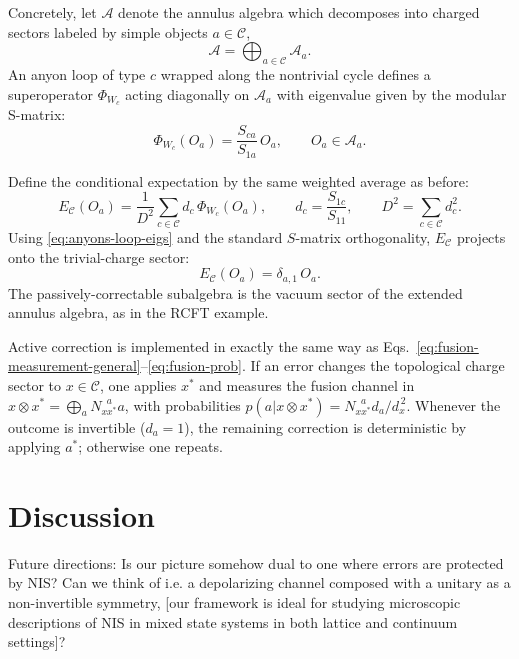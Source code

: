 \documentclass{article}
\newcommand{\mA}{\mathcal{A}}
\theoremstyle{definition}
\begin{document}
  Concretely, let $\mA$ denote the annulus algebra which decomposes into charged
  sectors labeled by simple objects $a\in\mathcal{C}$,
  \begin{equation}
    \mA=\bigoplus_{a\in\mathcal{C}}\mA_{a}.
  \end{equation}
  An anyon loop of type $c$ wrapped along the nontrivial cycle defines a
  superoperator $\Phi_{W_c}$ acting diagonally on $\mA_{a}$ with eigenvalue
  given by the modular S-matrix:
  \begin{equation}
    \label{eq:anyons-loop-eigs}\Phi_{W_c}(O_{a})=\frac{S_{ca}}{S_{1a}}\,O_{a},\qquad
    O_{a}\in\mA_{a}.
  \end{equation}

  Define the conditional expectation by the same weighted average as before:
  \begin{equation}
    \label{eq:anyons-condexp}E_{\mathcal{C}}(O_{a})=\frac{1}{D^{2}}\sum_{c\in\mathcal{C}}
    d_{c}\,\Phi_{W_c}(O_{a}),\qquad d_{c}=\frac{S_{1c}}{S_{11}},\qquad D^{2}= \sum
    _{c\in\mathcal{C}}d_{c}^{2}.
  \end{equation}
  Using \eqref{eq:anyons-loop-eigs} and the standard $S$-matrix orthogonality, $E
  _{\mathcal{C}}$ projects onto the trivial-charge sector:
  \begin{equation}
    E_{\mathcal{C}}(O_{a})=\delta_{a,1}\,O_{a}.
  \end{equation}
  The passively-correctable subalgebra is the vacuum sector of the extended
  annulus algebra, as in the RCFT example.

  Active correction is implemented in exactly the same way as Eqs.~\eqref{eq:fusion-measurement-general}--\eqref{eq:fusion-prob}.
  If an error changes the topological charge sector to $x\in\mathcal{C}$, one applies
  $x^{*}$ and measures the fusion channel in $x\otimes x^{*}=\bigoplus_{a}N_{xx^*}
  ^{\;\;a}a$, with probabilities
  $p(a|x\otimes x^{*})=N_{xx^*}^{\;\;a}d_{a}/d_{x}^{\,2}$. Whenever the outcome is
  invertible ($d_{a}=1$), the remaining correction is deterministic by applying
  $a^{*}$; otherwise one repeats.

  \section{Discussion}

  \color{brown}
  Future directions: Is our picture somehow dual to one where errors are protected
  by NIS? Can we think of i.e. a depolarizing channel composed with a unitary as
  a non-invertible symmetry, [our framework is ideal for studying microscopic descriptions
  of NIS in mixed state systems in both lattice and continuum settings]?
\end{document}

